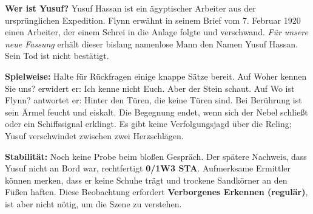 \begin{meisterinfo}
\textbf{Wer ist Yusuf?} Yusuf Hassan ist ein ägyptischer Arbeiter aus der ursprünglichen Expedition. Flynn erwähnt in seinem Brief vom 7. Februar 1920 einen Arbeiter, der einem Schrei in die Anlage folgte und verschwand. \emph{Für unsere neue Fassung} erhält dieser bislang namenlose Mann den Namen Yusuf Hassan. Sein Tod ist nicht bestätigt.

\textbf{Spielweise:} Halte für Rückfragen einige knappe Sätze bereit. Auf \glqq{}Woher kennen Sie uns?\grqq{} erwidert er: \glqq{}Ich kenne nicht Euch. Aber der Stein schaut.\grqq{} Auf \glqq{}Wo ist Flynn?\grqq{} antwortet er: \glqq{}Hinter den Türen, die keine Türen sind.\grqq{} Bei Berührung ist sein Ärmel feucht und eiskalt. Die Begegnung endet, wenn sich der Nebel schlie\ss{}t oder ein Schiffssignal erklingt. Es gibt keine Verfolgungsjagd über die Reling; Yusuf verschwindet zwischen zwei Herzschlägen.

\textbf{Stabilität:} Noch keine Probe beim blo\ss{}en Gespräch. Der spätere Nachweis, dass Yusuf nicht an Bord war, rechtfertigt \textbf{0/1W3 STA}. Aufmerksame Ermittler können merken, dass er keine Schuhe trägt und trockene Sandkörner an den Fü\ss{}en haften. Diese Beobachtung erfordert \textbf{Verborgenes Erkennen (regulär)}, ist aber nicht nötig, um die Szene zu verstehen.
\end{meisterinfo}

